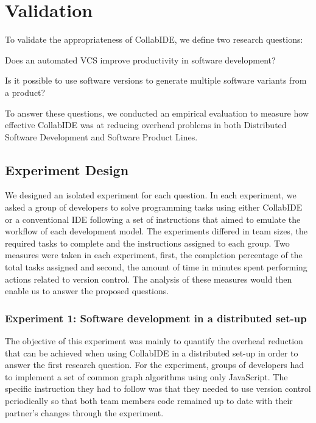 

\section{Validation}
\label{sec:validation}

To validate the appropriateness of CollabIDE, we define two research questions:
\begin{enumerate*}[label=(\arabic*)]
\item Does an automated \ac{VCS} improve productivity in software development?
\item Is it possible to use software versions to generate multiple software variants from a product?
\end{enumerate*} 
To answer these questions, we conducted an empirical evaluation 
to measure how effective CollabIDE was at reducing overhead problems 
in both Distributed Software Development and Software Product Lines.

\subsection{Experiment Design}


We designed an isolated experiment for each question. In each experiment, we asked 
a group of developers to solve programming tasks using either CollabIDE or a 
conventional IDE following a set of instructions that aimed to emulate the workflow of each development model. The experiments differed in team sizes, the required tasks to complete and the instructions assigned to each group. Two measures were taken in each experiment, first, the completion percentage of the total tasks assigned and second, the amount of time in minutes spent performing actions related to version control. The analysis of these measures would then enable us to answer the proposed questions.

\subsubsection{Experiment 1: Software development in a distributed set-up}
The objective of this experiment was mainly to quantify the overhead reduction that can be achieved when using CollabIDE in a distributed set-up in order to answer the first research question. For the experiment, groups of developers had to implement a set of common graph algorithms using only JavaScript. The specific instruction they had to follow was that they needed to use version control periodically so that both team members code remained up to date with their partner's changes through the experiment. 



